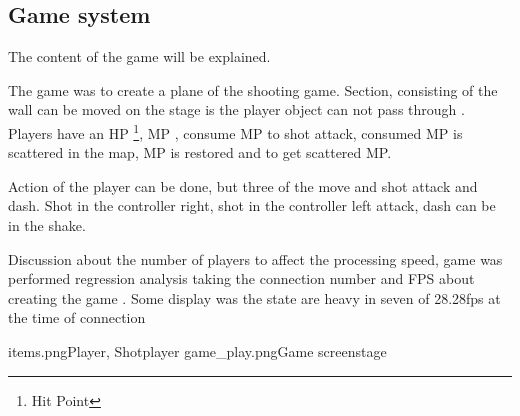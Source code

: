 \subsection{Game system}

The content of the game will be explained.

The game was to create a plane of the shooting game. Section, consisting of the wall can be moved on the stage is the player  object can not pass through .
Players have an HP \footnote{Hit Point}, MP , consume MP to shot attack, consumed MP is scattered in the map, MP is restored and to get scattered MP.

Action of the player can be done, but three of the move and shot attack and dash. Shot in the controller right, shot in the controller left attack, dash can be in the shake.

Discussion about the number of players to affect the processing speed, game was performed regression analysis taking the connection number and FPS about creating the game .
Some display was the state are heavy in seven of 28.28fps at the time of connection

\myfigtwo
{items.png}{Player, Shot}{player}
{game_play.png}{Game screen}{stage}


